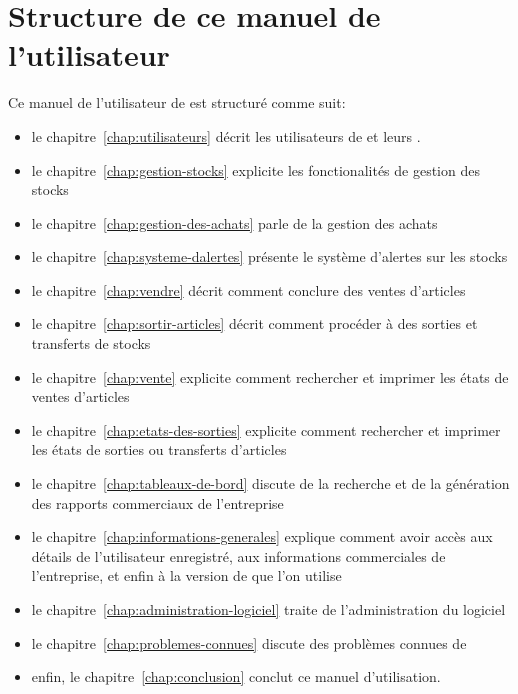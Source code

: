 \section{Structure de ce manuel de l'utilisateur}
Ce manuel de  l'utilisateur de \yeren est structur\'e
comme suit:

\begin{itemize}[]
	\item le chapitre~\ref{chap:utilisateurs} d\'ecrit
	les utilisateurs de \yeren et leurs \roles. 
	     
	\item le chapitre~\ref{chap:gestion-stocks} explicite
	les fonctionalit\'es de gestion des stocks

	\item le chapitre~\ref{chap:gestion-des-achats} parle
	de la gestion des achats
	
	\item le chapitre~\ref{chap:systeme-dalertes}
	pr\'esente le syst\`eme d'alertes sur les stocks
	
	\item le chapitre~\ref{chap:vendre} d\'ecrit comment
	conclure des ventes d'articles
	
	\item le chapitre~\ref{chap:sortir-articles} d\'ecrit
	comment proc\'eder \`a des sorties et transferts de stocks
	
	\item le chapitre~\ref{chap:vente} explicite comment
	rechercher et imprimer les \'etats de ventes d'articles
	
	\item le chapitre~\ref{chap:etats-des-sorties} explicite
	comment rechercher et imprimer les \'etats de sorties ou
	transferts d'articles
	
	\item le chapitre~\ref{chap:tableaux-de-bord} discute
	de la recherche et de la g\'en\'eration des rapports
	commerciaux de l'entreprise
	
	\item le chapitre~\ref{chap:informations-generales}
	explique comment avoir acc\`es aux d\'etails de
	l'utilisateur enregistr\'e, aux informations commerciales
	de l'entreprise, et enfin \`a la version de \yeren que
	l'on utilise
	
	\item le chapitre~\ref{chap:administration-logiciel}
	traite de l'administration du logiciel

	\item le chapitre~\ref{chap:problemes-connues}
	discute des probl\`emes connues de \yeren
	
	\item enfin, le chapitre~\ref{chap:conclusion} conclut
	ce manuel d'utilisation.
\end{itemize}

